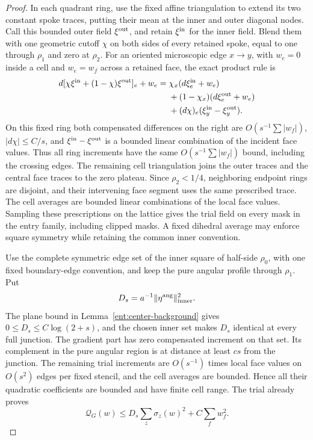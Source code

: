 \begin{proof}
In each quadrant ring, use the fixed affine triangulation to extend
its two constant spoke traces, putting their mean at the inner and
outer diagonal nodes.  Call this bounded outer field \(\xi^{\rm out}\),
and retain \(\xi^{\rm in}\) for the inner field.  Blend them with one geometric cutoff \(\chi\)
on both sides of every retained spoke, equal to one through
\(\rho_1\) and zero at \(\rho_2\).  For an oriented microscopic
edge \(x\to y\), with \(w_e=0\) inside a cell and \(w_e=w_f\)
across a retained face, the exact product rule is
\[
\begin{split}
 d[\chi\xi^{\rm in}+(1-\chi)\xi^{\rm out}]_e+w_e
 ={}&\chi_x(d\xi^{\rm in}_e+w_e)\\
 &{}+(1-\chi_x)(d\xi^{\rm out}_e+w_e)\\
 &{}+(d\chi)_e(\xi^{\rm in}_y-\xi^{\rm out}_y).
\end{split}
\]
On this fixed ring both compensated differences on the right are
\(O(s^{-1}\sum|w_f|)\), \(|d\chi|\le C/s\), and
\(\xi^{\rm in}-\xi^{\rm out}\) is a
bounded linear combination of the incident face values.  Thus all
ring increments have the same \(O(s^{-1}\sum|w_f|)\) bound,
including the crossing edges.  The remaining cell triangulation
joins the outer traces and the central face traces to the zero
plateau.  Since \(\rho_2<1/4\), neighboring endpoint rings are
disjoint, and their intervening face segment uses the same prescribed
trace.  The cell averages are bounded linear combinations of the
local face values.  Sampling these prescriptions on the lattice
gives the trial field on every mask in the entry family, including
clipped masks.  A fixed dihedral average may enforce square symmetry
while retaining the common inner convention.

Use the complete symmetric edge set of the inner square of half-side
\(\rho_0\), with one fixed boundary-edge convention, and keep the
pure angular profile through \(\rho_1\).  Put
\[
                 D_s=a^{-1}\|\eta^{\rm ang}\|_{\rm inner}^2 .
\]
The plane bound in Lemma~\ref{ent:center-background} gives
\(0\le D_s\le C\log(2+s)\), and the chosen inner set makes \(D_s\)
identical at every full junction.  The gradient part has zero
compensated increment on that set.  Its complement in the pure
angular region is at distance at least \(cs\) from the junction.
The remaining trial increments
are \(O(s^{-1})\) times local face values on \(O(s^2)\) edges per
fixed stencil, and the cell averages are bounded.  Hence all their
quadratic coefficients are bounded and have finite cell range.
The trial already proves
\[
 \mathcal Q_G(w)\le
 D_s\sum_z\sigma_z(w)^2+C\sum_f w_f^2.
\]


\end{proof}
